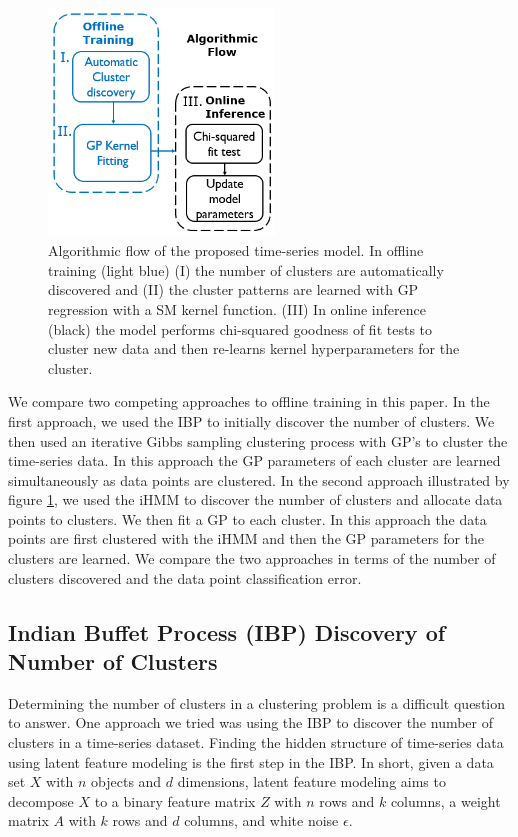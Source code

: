 \documentclass{article}
\begin{document}
\begin{figure}[ht]
\vskip 0.2in
\begin{center}
\centerline{\includegraphics[width=60mm]{AlgFlow2}}
\caption{Algorithmic flow of the proposed time-series model. In offline training (light blue) (I) the number of clusters are automatically discovered and (II) the cluster patterns are learned with GP regression with a SM kernel function. (III) In online inference (black) the model performs chi-squared goodness of fit tests to cluster new data and then re-learns kernel hyperparameters for the cluster.}
\label{AlgFlow2}
\end{center}
\vskip -0.2in
\end{figure} 

We compare two competing approaches to offline training in this paper. In the first approach, we used the IBP to initially discover the number of clusters. We then used an iterative Gibbs sampling clustering process with GP's to cluster the time-series data. In this approach the GP parameters of each cluster are learned simultaneously as data points are clustered. In the second approach illustrated by figure \ref{AlgFlow2}, we used the iHMM to discover the number of clusters and allocate data points to clusters. We then fit a GP to each cluster. In this approach the data points are first clustered with the iHMM and then the GP parameters for the clusters are learned. We compare the two approaches in terms of the number of clusters discovered and the data point classification error.

\subsection{Indian Buffet Process (IBP) Discovery of Number of Clusters}
Determining the number of clusters in a clustering problem is a difficult question to answer. One approach we tried was using the IBP to discover the number of clusters in a time-series dataset. Finding the hidden structure of time-series data using latent feature modeling is the first step in the IBP. In short, given a data set $X$ with $n$ objects and $d$ dimensions, latent feature modeling aims to decompose $X$ to a binary feature matrix $Z$ with $n$ rows and $k$ columns, a weight matrix $A$ with $k$ rows and $d$ columns, and white noise $\epsilon$.
\end{document}
